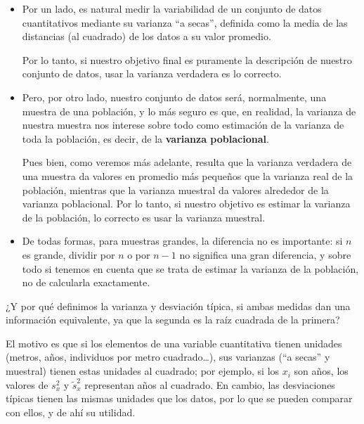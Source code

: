 \documentclass[
  spanish,
  letterpaper,
  DIV=11,
  numbers=noendperiod]{scrreprt}
\begin{document}
\begin{itemize}
\item
  Por un lado, es natural medir la variabilidad de un conjunto de datos
  cuantitativos mediante su varianza ``a secas'', definida como la media
  de las distancias (al cuadrado) de los datos a su valor promedio.

  Por lo tanto, si nuestro objetivo final es puramente la descripción de
  nuestro conjunto de datos, usar la varianza verdadera es lo correcto.
\item
  Pero, por otro lado, nuestro conjunto de datos será, normalmente, una
  muestra de una población, y lo más seguro es que, en realidad, la
  varianza de nuestra muestra nos interese sobre todo como estimación de
  la varianza de toda la población, es decir, de la \textbf{varianza
  poblacional}.

  Pues bien, como veremos más adelante, resulta que la varianza
  verdadera de una muestra da valores en promedio más pequeños que la
  varianza real de la población, mientras que la varianza muestral da
  valores alrededor de la varianza poblacional. Por lo tanto, si nuestro
  objetivo es estimar la varianza de la población, lo correcto es usar
  la varianza muestral.
\item
  De todas formas, para muestras grandes, la diferencia no es
  importante: si \(n\) es grande, dividir por \(n\) o por \(n-1\) no
  significa una gran diferencia, y sobre todo si tenemos en cuenta que
  se trata de estimar la varianza de la población, no de calcularla
  exactamente.
\end{itemize}

\begin{tcolorbox}[enhanced jigsaw, arc=.35mm, bottomrule=.15mm, bottomtitle=1mm, breakable, colback=white, colbacktitle=quarto-callout-note-color!10!white, colframe=quarto-callout-note-color-frame, coltitle=black, left=2mm, leftrule=.75mm, opacityback=0, opacitybacktitle=0.6, rightrule=.15mm, title=\textcolor{quarto-callout-note-color}{\faInfo}\hspace{0.5em}{Nota}, titlerule=0mm, toprule=.15mm, toptitle=1mm]

¿Y por qué definimos la varianza y desviación típica, si ambas medidas
dan una información equivalente, ya que la segunda es la raíz cuadrada
de la primera?

El motivo es que si los elementos de una variable cuantitativa tienen
unidades (metros, años, individuos por metro cuadrado\ldots), sus
varianzas (``a secas'' y muestral) tienen estas unidades al cuadrado;
por ejemplo, si los \(x_i\) son años, los valores de \(s_x^2\) y
\(\tilde{s}_x^2\) representan años al cuadrado. En cambio, las
desviaciones típicas tienen las mismas unidades que los datos, por lo
que se pueden comparar con ellos, y de ahí su utilidad.

\end{tcolorbox}
\end{document}
